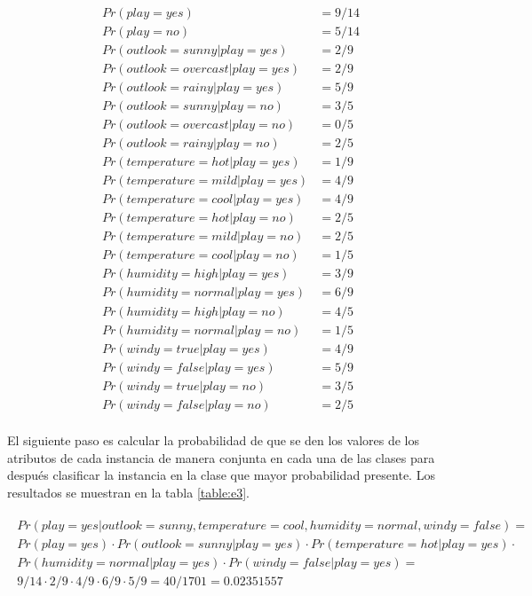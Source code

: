\documentclass{article}
\begin{document}
		\begin{align*}
			Pr(play = yes) &= 9/14 \\
			Pr(play = no) &= 5/14 \\
			Pr(outlook = sunny 		| play = yes) &= 2/9 \\
			Pr(outlook = overcast | play = yes) &= 2/9 \\
			Pr(outlook = rainy 		| play = yes) &= 5/9 \\
			Pr(outlook = sunny 		| play = no) &= 3/5 \\
			Pr(outlook = overcast | play = no) &= 0/5 \\
			Pr(outlook = rainy 		| play = no) &= 2/5 \\
			Pr(temperature = hot 	| play = yes) &= 1/9 \\
			Pr(temperature = mild | play = yes) &= 4/9 \\
			Pr(temperature = cool | play = yes) &= 4/9 \\
			Pr(temperature = hot 	| play = no) &= 2/5 \\
			Pr(temperature = mild | play = no) &= 2/5 \\
			Pr(temperature = cool | play = no) &= 1/5 \\
			Pr(humidity = high 		| play = yes) &= 3/9 \\
			Pr(humidity = normal 	| play = yes) &= 6/9 \\
			Pr(humidity = high		| play = no) &= 4/5 \\
			Pr(humidity = normal 	| play = no) &= 1/5 \\
			Pr(windy = true 			|	 play = yes) &= 4/9 \\
			Pr(windy = false 			| play = yes) &= 5/9 \\
			Pr(windy = true 			| play = no) &= 3/5 \\
			Pr(windy = false 			| play = no) &= 2/5
		\end{align*}

		\paragraph{}
		El siguiente paso es calcular la probabilidad de que se den los valores de los atributos de cada instancia de manera conjunta en cada una de las clases para después clasificar la instancia en la clase que mayor probabilidad presente. Los resultados se muestran en la tabla \ref{table:e3}.

		\begin{align}
		\label{eq:x1_probability_yes}
			\begin{split}
				Pr(play = yes | outlook = sunny, temperature = cool, humidity = normal, windy = false) = \\
				Pr(play = yes) \cdot Pr(outlook = sunny | play = yes) \cdot Pr(temperature = hot 	| play = yes) \cdot \\
				Pr(humidity = normal 	| play = yes) \cdot Pr(windy = false 	| play = yes) = \\
				9/14 \cdot 2/9 \cdot 4/9 \cdot 6/9 \cdot 5/9 = 40/1701 = 0.02351557
			\end{split}
		\end{align}
\end{document}

